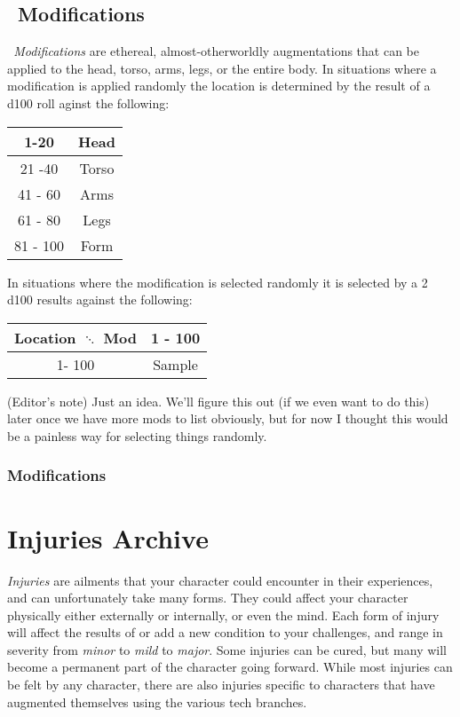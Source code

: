 \section{\magit\ Modifications}\label{sec:magi_mods}
\emph{\magit\ Modifications} are ethereal, almost-otherworldly augmentations that can be applied to the head, torso, arms, legs, or the entire body. In situations where a modification is applied randomly the location is determined by the result of a d100 roll aginst the following:
\begin{center}
\begin{tabular}{c | c}
1-20 & Head \\
\hline
21 -40 & Torso \\
\hline
41 - 60 & Arms \\
\hline
61 - 80 & Legs \\
\hline
81 - 100 & Form \\
\end{tabular}
\end{center}

In situations where the modification is selected randomly it is selected by a 2 d100 results against the following:
\begin{center}
\begin{tabular}{c | c}
Location $\ddots$ Mod & 1 - 100 \\
\hline
1- 100 & Sample
\end{tabular}
\end{center}
(Editor's note) Just an idea. We'll figure this out (if we even want to do this) later once we have more mods to list obviously, but for now I thought this would be a painless way for selecting things randomly.
\subsection*{Modifications}
\begin{multicols}{2}
\end{multicols}
\clearpage
\chapter{Injuries Archive}\label{ch:ref_injure}
\emph{Injuries} are ailments that your character could encounter in their experiences, and can unfortunately take many forms. They could affect your character physically either externally or internally, or even the mind. Each form of injury will affect the results of or add a new condition to your challenges, and range in severity from \emph{minor} to \emph{mild} to \emph{major}. Some injuries can be cured, but many will become a permanent part of the character going forward. While most injuries can be felt by any character, there are also injuries specific to characters that have augmented themselves using the various tech branches.


